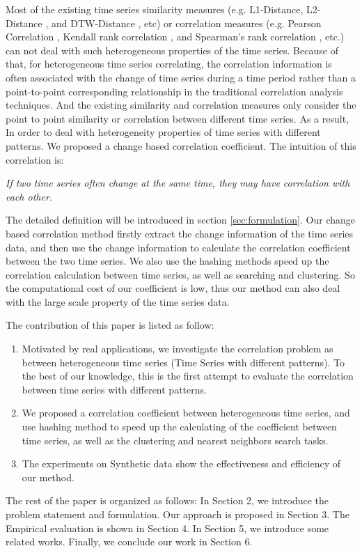 Most of the existing time series similarity measures (e.g. L1-Distance, L2-Distance \cite{han2011data}, and DTW-Distance \cite{muller2007dynamic}, etc) or correlation measures (e.g. Pearson Correlation \cite{pearson1904mathematical}, Kendall rank correlation \cite{kendall1938new}, and Spearman's rank correlation \cite{pirie1988spearman}, etc.) can not deal with such heterogeneous properties of the time series. 
Because of that, for heterogeneous time series correlating, the correlation information is often associated with the change of time series during a time period rather than a point-to-point corresponding relationship in the traditional correlation analysis techniques. 
And the existing similarity and correlation measures only consider the point to point similarity or correlation between different time series.
As a result, In order to deal with heterogeneity properties of time series with different patterns. 
We proposed a change based correlation coefficient. 
The intuition of this correlation is: 

\textit{If two time series often change at the same time, they may have correlation with each other.} 

The detailed definition will be introduced in section \ref{sec:formulation}. 
Our change based correlation method firstly extract the change information of the time series data, and then use the change information to calculate the correlation coefficient between the two time series.
We also use the hashing methods speed up the correlation calculation between time series, as well as searching and clustering. 
So the computational cost of our coefficient is low, thus our method can also deal with the large scale property of the time series data.

The contribution of this paper is listed as follow:
\begin{enumerate}
\item Motivated by real applications, we investigate the correlation
problem as between heterogeneous time series (Time Series with different patterns).
To the best of our knowledge, this is the first attempt
to evaluate the correlation between time series with different patterns.

\item We proposed a correlation coefficient between heterogeneous time series, and 
use hashing method to speed up the calculating of the coefficient between time series, as well as the clustering and nearest neighbors search tasks.

\item The experiments on Synthetic data show the effectiveness and efficiency of our method.
\end{enumerate}

The rest of the paper is organized as follows: In Section 2, we introduce the problem
statement and formulation. Our approach is proposed in Section 3. The Empirical evaluation is shown in Section 4. In Section 5, we introduce some
related works. Finally, we conclude our work in Section 6.



